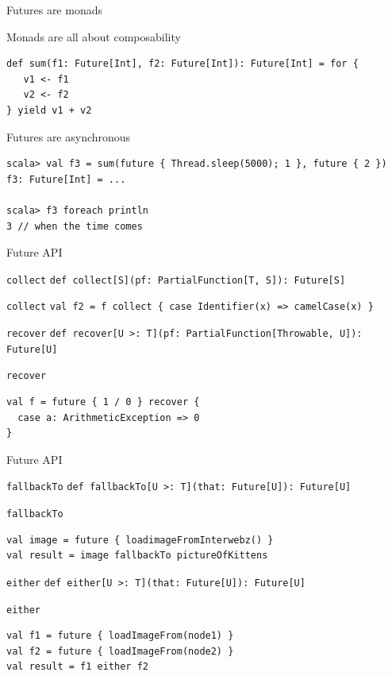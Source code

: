 \begin{frame}[fragile]{Futures are monads}
\begin{exampleblock}{Monads are all about composability}
\begin{lstlisting}
def sum(f1: Future[Int], f2: Future[Int]): Future[Int] = for {
   v1 <- f1
   v2 <- f2
} yield v1 + v2
\end{lstlisting}
\end{exampleblock}
\pause
\begin{exampleblock}{Futures are asynchronous}
\begin{lstlisting}
scala> val f3 = sum(future { Thread.sleep(5000); 1 }, future { 2 })
f3: Future[Int] = ...

scala> f3 foreach println
3 // when the time comes
\end{lstlisting}
\end{exampleblock}
\end{frame}

\begin{frame}[fragile]{Future API}
\begin{block}{\lstinline!collect!}
\lstinline!def collect[S](pf: PartialFunction[T, S]): Future[S]!
\end{block}
\begin{exampleblock}{\lstinline!collect!}
\lstinline!val f2 = f collect { case Identifier(x) => camelCase(x) }!
\end{exampleblock}
\pause
\begin{block}{\lstinline!recover!}
\lstinline!def recover[U >: T](pf: PartialFunction[Throwable, U]): Future[U]!
\end{block}
\begin{exampleblock}{\lstinline!recover!}
\begin{lstlisting}
val f = future { 1 / 0 } recover {
  case a: ArithmeticException => 0
}
\end{lstlisting}
\end{exampleblock}
\end{frame}

\begin{frame}[fragile]{Future API}
\begin{block}{\lstinline!fallbackTo!}
\lstinline!def fallbackTo[U >: T](that: Future[U]): Future[U]!
\end{block}
\begin{exampleblock}{\lstinline!fallbackTo!}
\begin{lstlisting}
val image = future { loadimageFromInterwebz() }
val result = image fallbackTo pictureOfKittens
\end{lstlisting}
\end{exampleblock}
\pause
\begin{block}{\lstinline!either!}
\lstinline!def either[U >: T](that: Future[U]): Future[U]!
\end{block}
\begin{exampleblock}{\lstinline!either!}
\begin{lstlisting}
val f1 = future { loadImageFrom(node1) }
val f2 = future { loadImageFrom(node2) }
val result = f1 either f2
\end{lstlisting}
\end{exampleblock}
\end{frame}


